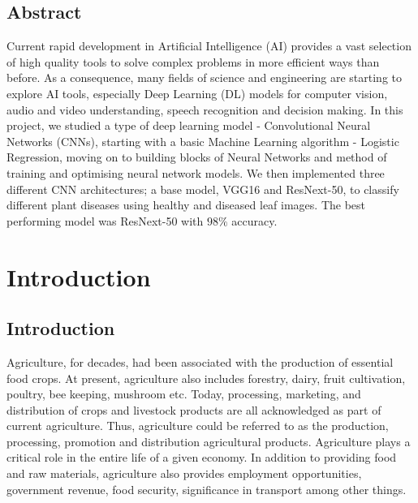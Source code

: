 \documentclass[12pt]{report}
\numberwithin{equation}{section}
\begin{document}
\section*{\centering Abstract}
Current rapid development in Artificial Intelligence (AI) provides a vast selection of high quality tools to solve complex problems in more efficient ways than before. As a consequence, many fields of science and engineering are starting to explore AI tools, especially Deep Learning (DL) models for computer vision, audio and video understanding, speech recognition and decision making. In this project, we studied a type of deep learning model - Convolutional Neural Networks (CNNs), starting with a basic Machine Learning algorithm - Logistic Regression, moving on to building blocks of Neural Networks and method of training and optimising neural network models. We then implemented three different CNN architectures; a base model, VGG16 and ResNext-50, to classify different plant diseases using healthy and diseased leaf images. The best performing model was ResNext-50 with $98\%$ accuracy. 




\newpage {}
\renewcommand*{\contentsname}{\centering \Large TABLE OF CONTENTS}
\tableofcontents 

\newpage {}
\renewcommand{\cftfignumwidth}{6em}
\renewcommand{\cftfigpresnum}{Figure }
\listoffigures

\newpage {}
\renewcommand{\cfttabnumwidth}{6em}
\renewcommand{\cfttabpresnum}{Table }
\listoftables


\newpage
{} 

\chapter{Introduction}
\setcounter{section}{-1}   


\section{Introduction}
Agriculture, for decades, had been associated with the production of essential food crops. At present, agriculture also includes forestry, dairy, fruit cultivation, poultry, bee keeping, mushroom etc. Today, processing, marketing, and distribution of crops and livestock products are all acknowledged as part of current agriculture. Thus, agriculture could be referred to as the production, processing, promotion and distribution agricultural products. Agriculture plays a critical role in the entire life of a given economy. In addition to providing food and raw materials, agriculture also provides employment opportunities, government revenue, food security, significance in transport among other things. 
\end{document}
